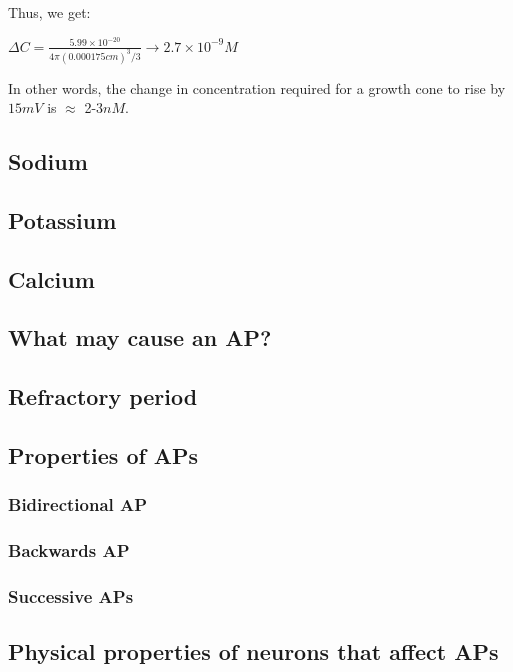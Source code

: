 \documentclass[12pt]{amsart}
\begin{document}
\bigskip

    Thus, we get:

    \bigskip
    
\begin{center}

    $\Delta C = \frac{5.99\times10^{-20}}{4\pi (0.000175cm)^3 /3} \rightarrow 2.7 \times10^{-9} M$
    
\end{center}

\bigskip

In other words, the change in concentration required for a growth cone to rise by $15mV$ is $\approx$ 2-3$nM$.  



\subsection{Sodium}
\subsection{Potassium}
\subsection{Calcium}
\subsection{What may cause an AP?}
\subsection{Refractory period}
\subsection{Properties of APs}
\subsubsection{Bidirectional AP}
\subsubsection{Backwards AP}
\subsubsection{Successive APs}
\subsection{Physical properties of neurons that affect APs}
\end{document}
